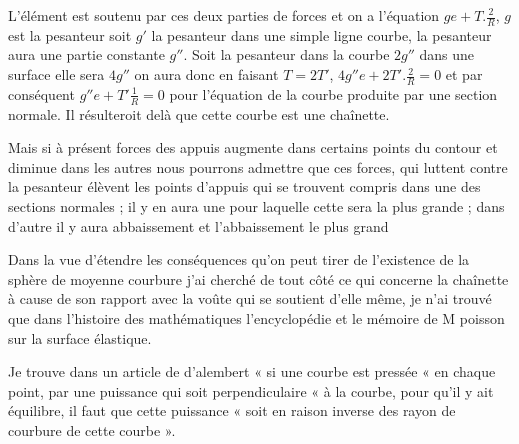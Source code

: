 \documentclass[11pt,a4paper]{article}
\begin{document}
L'élément est soutenu par ces deux parties de forces et on a l'équation
$ge + T.\frac{2}{R}$, $g$ est la pesanteur soit $g'$ la pesanteur dans une
simple ligne courbe, la pesanteur aura une partie constante $g''$. Soit la
pesanteur dans la courbe $2g''$ dans une surface elle sera $4g''$ on aura
donc en faisant $T = 2T'$, $4g''e + 2T'.\frac{2}{R} = 0$ et par conséquent
 $g''e + T'\frac{1}{R} = 0$ pour l'équation de la courbe produite
par une section normale. Il résulteroit delà que cette courbe est une
chaînette.

Mais si à présent  forces des appuis augmente dans
certains points du contour et diminue dans les autres nous pourrons admettre
que ces forces, qui luttent contre la pesanteur élèvent les points d'appuis
qui se trouvent compris dans une des sections normales ; il y en aura une
pour laquelle cette  sera la plus grande ; dans d'autre
il y aura abbaissement et l'abbaissement le plus grand


Dans la vue d'étendre les conséquences qu'on peut tirer de l'existence de la
sphère de moyenne courbure j'ai cherché de tout côté ce qui concerne la
chaînette à cause de son rapport avec la voûte qui se soutient d'elle même,
je n'ai trouvé que dans l'histoire des mathématiques l'encyclopédie et le
mémoire de M poisson sur la surface élastique.

Je trouve dans un article de d'alembert « si une courbe est pressée « en
chaque point, par une puissance qui soit perpendiculaire « à la courbe, pour
qu'il y ait équilibre, il faut que cette puissance « soit en raison inverse
des rayon de courbure de cette courbe ».
\end{document}
